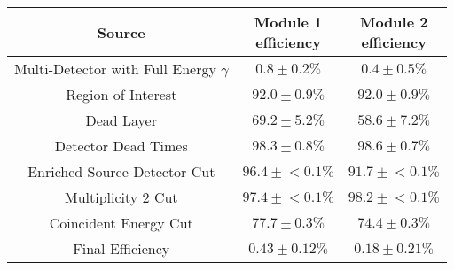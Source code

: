\begin{tabular}{|c|c|c|}
\hline
  Source & \makecell{Module 1\\efficiency} & \makecell{Module 2\\efficiency} \\
\hline
  \makecell{Multi-Detector with\\Full Energy $\gamma$} & $0.8 \pm 0.2\%$ & $0.4 \pm 0.5\%$ \\
  Region of Interest & $92.0 \pm 0.9\%$ & $92.0 \pm 0.9\%$ \\
  Dead Layer & $69.2 \pm 5.2\%$ & $58.6 \pm 7.2\%$ \\
  Detector Dead Times & $98.3 \pm 0.8\%$ & $98.6 \pm 0.7\%$ \\
  Enriched Source Detector Cut & $96.4 \pm{}<\!0.1\%$ & $91.7 \pm{}<\!0.1\%$ \\
  Multiplicity 2 Cut & $97.4 \pm{}<\!0.1\%$ & $98.2 \pm{}<\!0.1\%$ \\
  Coincident Energy Cut & $77.7 \pm 0.3\%$ & $74.4 \pm 0.3\%$ \\
  \hline Final Efficiency & $0.43 \pm 0.12\%$ & $0.18 \pm 0.21\%$ \\
\hline
\end{tabular}
